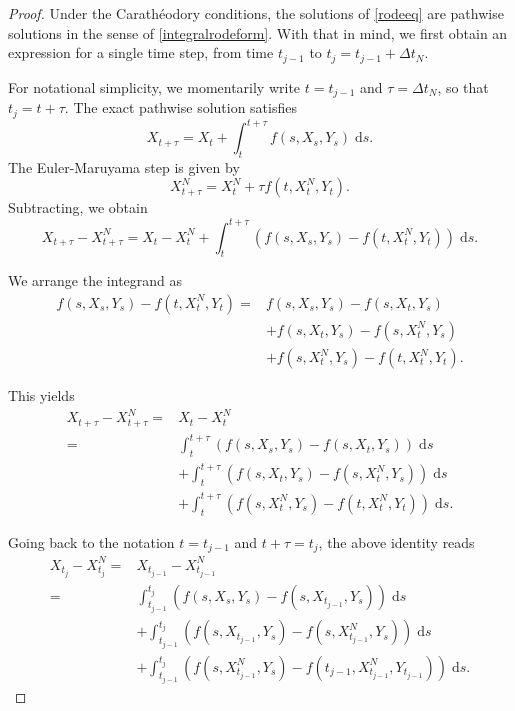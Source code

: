 \documentclass[reqno,12pt]{amsart}
\theoremstyle{plain}%
\theoremstyle{definition}
\begin{document}
\begin{proof}
    Under the Carath\'eodory conditions, the solutions of \eqref{rodeeq} are pathwise solutions in the sense of \eqref{integralrodeform}. With that in mind, we first obtain an expression for a single time step, from time $t_{j-1}$ to $t_j = t_{j-1} + \Delta t_N$.
    
    For notational simplicity, we momentarily write $t = t_{j-1}$ and $\tau = \Delta t_N$, so that $t_j = t + \tau$. The exact pathwise solution satisfies
    $$
    X_{t + \tau} = X_t + \int_t^{t + \tau} f(s, X_s, Y_s) \;\mathrm{d}s.
    $$
    The Euler-Maruyama step is given by
    $$
    X_{t+\tau}^N = X_t^N + \tau f(t, X_t^N, Y_t).
    $$
    Subtracting, we obtain
    $$
    X_{t + \tau} - X_{t + \tau}^N = X_t - X_t^N + \int_t^{t + \tau} \left( f(s, X_s, Y_s) - f(t, X_t^N, Y_t) \right)\;\mathrm{d}s.
    $$

    We arrange the integrand as
    \begin{align*}
    f(s, X_s, Y_s) - f(t, X_t^N, Y_t) = & f(s, X_s, Y_s) - f(s, X_t, Y_s) \\ 
    & + f(s, X_t, Y_s) - f(s, X_t^N, Y_s) \\
    & + f(s, X_t^N, Y_s) - f(t, X_t^N, Y_t).
    \end{align*}

    This yields
    \begin{align*}
        X_{t + \tau} - X_{t + \tau}^N  = & X_t - X_t^N \\
        = &  \int_t^{t + \tau} \left( f(s, X_s, Y_s) - f(s, X_t, Y_s) \right)\;\mathrm{d}s \\ 
        & + \int_t^{t + \tau} \left( f(s, X_t, Y_s) - f(s, X_t^N, Y_s) \right)\;\mathrm{d}s \\
        & + \int_t^{t + \tau} \left( f(s, X_t^N, Y_s) - f(t, X_t^N, Y_t) \right)\;\mathrm{d}s.
    \end{align*}

    Going back to the notation $t = t_{j-1}$ and $t + \tau = t_j$, the above identity reads
    \begin{equation}
        \label{singlestep}
        \begin{aligned}
            X_{t_j} - X_{t_j}^N  = & X_{t_{j-1}} - X_{t_{j-1}}^N \\
            = &  \int_{t_{j-1}}^{t_j} \left( f(s, X_s, Y_s) - f(s, X_{t_{j-1}}, Y_s) \right)\;\mathrm{d}s \\ 
            & + \int_{t_{j-1}}^{t_j} \left( f(s, X_{t_{j-1}}, Y_s) - f(s, X_{t_{j-1}}^N, Y_s) \right)\;\mathrm{d}s \\
            & + \int_{t_{j-1}}^{t_j} \left( f(s, X_{t_{j-1}}^N, Y_s) - f(t_{j-1}, X_{t_{j-1}}^N, Y_{t_{j-1}}) \right)\;\mathrm{d}s.
        \end{aligned}
    \end{equation}


\end{proof}
\end{document}
